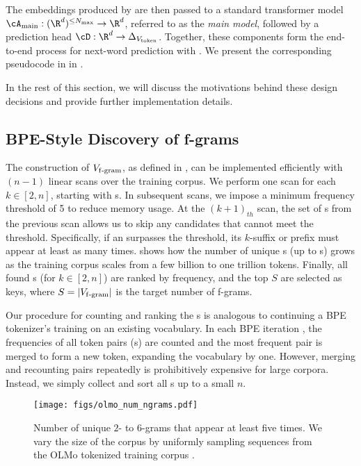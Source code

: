 The embeddings produced by \SCONE are then passed to a standard transformer model $\Amain : (\R^d)^{\le N_{\max}} \to \R^d$, referred to as the \emph{main model}, followed by a prediction head $\cD : \R^d \to \Delta_{\Vtoken}$. Together, these components form the end-to-end process for next-word prediction with \SCONE. We present the corresponding pseudocode in  in .








In the rest of this section, we will discuss the motivations behind these design decisions and provide further implementation details.


\subsection{\boldmath BPE-Style Discovery of f-grams}
\label{subsec:key_discovery}
The construction of $V_{\mathrm{f\text{-}gram}}$, as defined in , can be implemented efficiently with $(n-1)$ linear scans over the training corpus.
We perform one scan for each $k \in [2, n]$, starting with s.
In subsequent scans, we impose a minimum frequency threshold of 5 to reduce memory usage. At the $(k+1)_{th}$ scan, the set of s from the previous scan allows us to skip any  candidates that cannot meet the threshold. Specifically, if an  surpasses the threshold, its $k$-suffix or prefix must appear at least as many times.  shows how the number of unique s (up to s) grows as the training corpus scales from a few billion to one trillion tokens. Finally, all found s (for $k \in [2, n]$) are ranked by frequency, and the top $S$ are selected as keys, where $S=|V_{\mathrm{f\text{-}gram}}|$ is the target number of f-grams.

Our procedure for counting and ranking the s is analogous to continuing a BPE tokenizer’s training on an existing vocabulary. In each BPE iteration \citep{gage1994new,sennrich2015neural}, the frequencies of all token pairs (s) are counted and the most frequent pair is merged to form a new token, expanding the vocabulary by one. However, merging and recounting pairs repeatedly is prohibitively expensive for large corpora. Instead, we simply collect and sort all s up to a small $n$. 
\begin{figure}[t]
    \centering
    \texttt{[image: figs/olmo\_num\_ngrams.pdf]}
    \caption{Number of unique $2$- to $6$-grams that appear at least five times. We vary the size of the corpus by uniformly sampling sequences from the OLMo tokenized training corpus \citep{soldaini2024dolma}.} 
    \label{fig:num_ngrams}
\end{figure}

